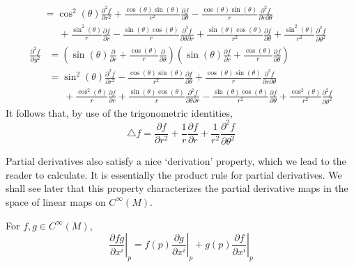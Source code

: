 \begin{example}
\begin{align*}
        &= \cos^2(\theta) \frac{\partial^2 f}{\partial r^2} + \frac{\cos(\theta) \sin(\theta)}{r^2} \frac{\partial f}{\partial \theta} - \frac{\cos(\theta) \sin(\theta)}{r} \frac{\partial^2 f}{\partial r \partial \theta}\\
        &\ \ \ \ \ \ \ + \frac{\sin^2(\theta)}{r} \frac{\partial f}{\partial r} - \frac{\sin(\theta) \cos(\theta)}{r} \frac{\partial^2 f}{\partial \theta \partial r} + \frac{\sin(\theta) \cos(\theta)}{r^2} \frac{\partial f}{\partial \theta} + \frac{\sin^2(\theta)}{r^2} \frac{\partial^2 f}{\partial \theta^2}
    \end{align*}
    \begin{align*}
        \frac{\partial^2 f}{\partial y^2} &= \left( \sin(\theta) \frac{\partial}{\partial r} + \frac{\cos(\theta)}{r} \frac{\partial}{\partial \theta} \right) \left( \sin(\theta) \frac{\partial f}{\partial r} + \frac{\cos(\theta)}{r} \frac{\partial f}{\partial \theta} \right)\\
        &= \sin^2(\theta) \frac{\partial^2 f}{\partial r^2} - \frac{\cos(\theta) \sin(\theta)}{r^2} \frac{\partial f}{\partial \theta} + \frac{\cos(\theta) \sin(\theta)}{r} \frac{\partial^2 f}{\partial r \partial \theta}\\
        &\ \ \ \ \ \ \ + \frac{\cos^2(\theta)}{r} \frac{\partial f}{\partial r} + \frac{\sin(\theta) \cos(\theta)}{r} \frac{\partial^2 f}{\partial \theta \partial r} - \frac{\sin(\theta) \cos(\theta)}{r^2} \frac{\partial f}{\partial \theta} + \frac{\cos^2(\theta)}{r^2} \frac{\partial^2 f}{\partial \theta^2}
    \end{align*}
    It follows that, by use of the trigonometric identities,
    \[ \bigtriangleup f = \frac{\partial f}{\partial r^2} + \frac{1}{r} \frac{\partial f}{\partial r} + \frac{1}{r^2} \frac{\partial^2 f}{\partial \theta^2} \]
\end{example}

Partial derivatives also satisfy a nice `derivation' property, which we lead to the reader to calculate. It is essentially the product rule for partial derivatives. We shall see later that this property characterizes the partial derivative maps in the space of linear maps on $C^\infty(M)$.

\begin{lemma}
    For $f,g \in C^\infty(M)$,
    \[ \left.\frac{\partial fg}{\partial x^i}\right|_p = f(p)\left.\frac{\partial g}{\partial x^i}\right|_p + g(p)\left.\frac{\partial f}{\partial x^i}\right|_p  \]
\end{lemma}

